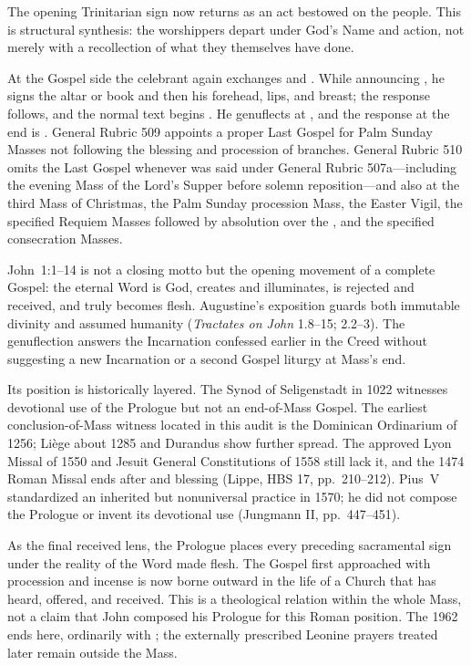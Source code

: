 The opening Trinitarian sign now returns as an act bestowed on the people. This is structural synthesis: the worshippers depart under God's Name and action, not merely with a recollection of what they themselves have done.


At the Gospel side the celebrant again exchanges  and . While announcing , he signs the altar or book and then his forehead, lips, and breast; the response  follows, and the normal text begins . He genuflects at , and the response at the end is . General Rubric 509 appoints a proper Last Gospel for Palm Sunday Masses not following the blessing and procession of branches. General Rubric 510 omits the Last Gospel whenever  was said under General Rubric 507a---including the evening Mass of the Lord's Supper before solemn reposition---and also at the third Mass of Christmas, the Palm Sunday procession Mass, the Easter Vigil, the specified Requiem Masses followed by absolution over the , and the specified consecration Masses.

John~1:1--14 is not a closing motto but the opening movement of a complete Gospel: the eternal Word is God, creates and illuminates, is rejected and received, and truly becomes flesh. Augustine's exposition guards both immutable divinity and assumed humanity (\emph{Tractates on John} 1.8--15; 2.2--3). The genuflection answers the Incarnation confessed earlier in the Creed without suggesting a new Incarnation or a second Gospel liturgy at Mass's end.

Its position is historically layered. The Synod of Seligenstadt in 1022 witnesses devotional use of the Prologue but not an end-of-Mass Gospel. The earliest conclusion-of-Mass witness located in this audit is the Dominican Ordinarium of 1256; Li\`ege about 1285 and Durandus show further spread. The approved Lyon Missal of 1550 and Jesuit General Constitutions of 1558 still lack it, and the 1474 Roman Missal ends after  and blessing (Lippe, HBS 17, pp.~210--212). Pius~V standardized an inherited but nonuniversal practice in 1570; he did not compose the Prologue or invent its devotional use (Jungmann II, pp.~447--451).

As the final received lens, the Prologue places every preceding sacramental sign under the reality of the Word made flesh. The Gospel first approached with procession and incense is now borne outward in the life of a Church that has heard, offered, and received. This is a theological relation within the whole Mass, not a claim that John composed his Prologue for this Roman position. The 1962  ends here, ordinarily with ; the externally prescribed Leonine prayers treated later remain outside the Mass.
